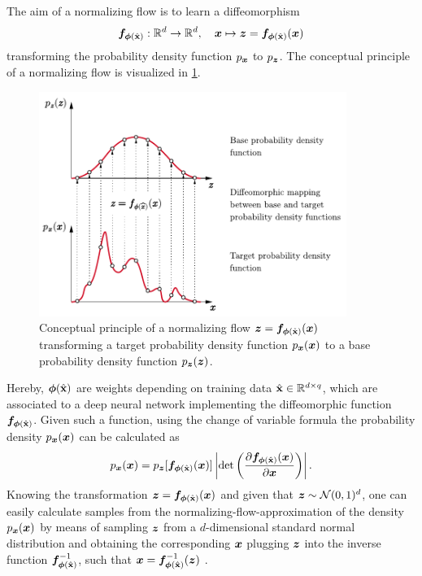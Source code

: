 \documentclass[a4paper,12pt]{report}
\def\lk#1{{\color{black}{#1}}}
\begin{document}
The aim of a normalizing flow is to learn a diffeomorphism \begin{equation}
\bm{f}_{\bm{\phi}(\hat{\boldsymbol{\mathbf{x}}})}:\mathbb{R}^d \rightarrow \mathbb{R}^d, \quad \bm{x} \mapsto \bm{z} = \bm{f}_{\bm{\phi}(\hat{\boldsymbol{\mathbf{x}}})}(\bm{x})
\end{equation} transforming the probability density function $p_{\bm{x}}$ to $p_{\bm{z}}$. The conceptual principle of a normalizing flow is visualized in \cref{fig:normflow}. 
\begin{figure}[h]
\centering
\includegraphics[width=10cm]{figures/normflow.pdf}
\caption{Conceptual principle of a normalizing flow $\bm{z} = \bm{f}_{\bm{\phi}(\hat{\boldsymbol{\mathbf{x}}})}(\bm{x})$ transforming a target probability density function $p_{\bm{x}}(\bm{x})$ to a base probability density function $p_{\bm{z}}(\bm{z})$.}
\label{fig:normflow}
\end{figure}
Hereby, $\bm{\phi}(\hat{\boldsymbol{\mathbf{x}}})$ are weights depending on training data $\hat{\boldsymbol{\mathbf{x}}} \in \mathbb{R}^{d\times q}$, which are associated to a deep neural network implementing the diffeomorphic function $\bm{f}_{\bm{\phi}(\hat{\boldsymbol{\mathbf{x}}})}$. Given such a function, using the change of variable formula the probability density $p_{\bm{x}}(\bm{x})$ can be calculated as \begin{equation}
p_{\bm{x}}(\bm{x}) = p_{\bm{z}}[\bm{f}_{\bm{\phi}(\hat{\boldsymbol{\mathbf{x}}})}(\bm{x})]\left|\det\left(\frac{\partial \bm{f}_{\bm{\phi}(\hat{\boldsymbol{\mathbf{x}}})}(\bm{x})}{\partial \bm{x}}\right)\right|.
\end{equation} Knowing the transformation $\bm{z} = \bm{f}_{\bm{\phi}(\hat{\boldsymbol{\mathbf{x}}})}(\bm{x})$ and given that $\bm{z} \sim \mathcal{N}(0,1)^d$, one can easily calculate samples from the normalizing-flow-approximation of the density $p_{\bm{x}}(\bm{x})$ by means of sampling $\bm{z}$ from a $d$-dimensional standard normal distribution and obtaining the corresponding $\bm{x}$ \lk{by} plugging $\bm{z}$ into the inverse function $\bm{f}_{\bm{\phi}(\hat{\boldsymbol{\mathbf{x}}})}^{-1}$, such that $\bm{x} = \bm{f}_{\bm{\phi}(\hat{\boldsymbol{\mathbf{x}}})}^{-1}(\bm{z})$ \lk{obtains}.
\end{document}
